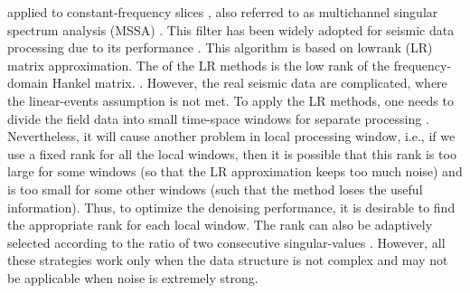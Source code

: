  applied to constant-frequency slices \cite[]{cadzow1988,trickett2008}, also referred to as multichannel singular spectrum analysis (MSSA) \cite[]{mssa,stephen2013,curveletieee2016}. This filter
has been widely adopted for seismic data processing due to its  performance \cite[]{ginolhac2013performance,gao2017five,wang2018hankel}. This algorithm is based on lowrank (LR) matrix approximation. The  of the LR methods is the low rank of the frequency-domain Hankel matrix.   \cite[]{mssa,yangkang2016irr5d,wang2020low}. However, the real seismic data are complicated, where the linear-events assumption is not met. To apply the LR methods, one needs to divide the field data into small time-space windows for separate processing \cite[]{zhangdong2017,shaohuan2017gji}. Nevertheless, it will cause another problem in local processing window, i.e., if we use a fixed rank for all the local windows, then it is possible that this rank is too large for some windows (so that the LR approximation keeps too much noise) and is too small for some other windows (such that the method loses the useful information). Thus, to optimize the denoising performance, it is desirable to find the appropriate rank for each local window. The rank can also be adaptively selected according to the ratio of two consecutive singular-values \cite[]{wujuan2018jge}. However, all these strategies work only when the data structure is not complex and may not be applicable when noise is extremely strong.

